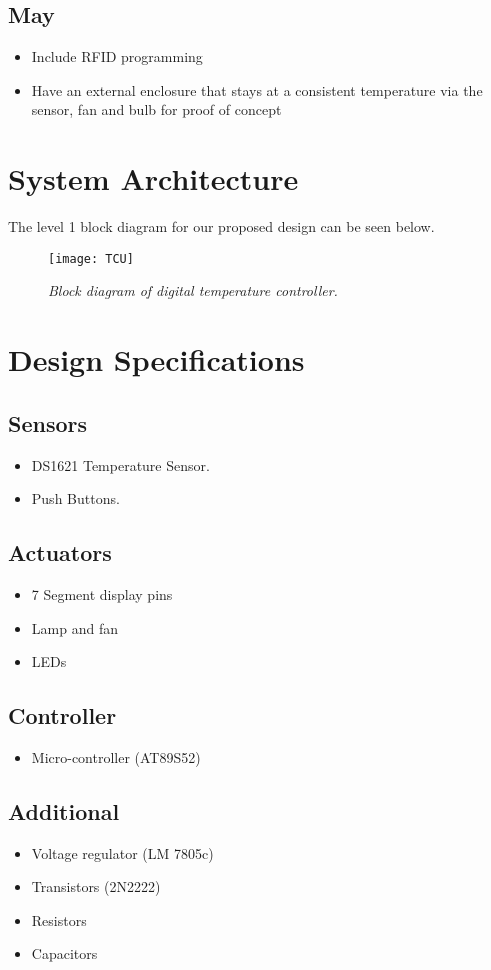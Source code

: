 \documentclass[11pt]{article}
\begin{document}
	
\subsection*{May}

\begin{itemize}
    \item Include RFID programming
\item Have an external enclosure that stays at a consistent temperature via the sensor, fan and bulb for proof of concept

\end{itemize}

\section*{System Architecture}
The level 1 block diagram for our proposed design can be seen below.
	
	\begin{figure}[H]
	\centering
	\texttt{[image: TCU]}
		\caption{\textit{Block diagram of digital temperature controller.}}
	\end{figure}

\section*{Design Specifications}

\subsection*{Sensors}
\begin{itemize}
    \item DS1621 Temperature Sensor.
    \item Push Buttons.

\end{itemize}

\subsection*{Actuators}
\begin{itemize}
    \item 7 Segment display pins
 \item Lamp and fan
\item LEDs
\end{itemize}

\subsection*{Controller}
\begin{itemize}
    \item Micro-controller (AT89S52)
\end{itemize}

\subsection*{Additional}
\begin{itemize}
    \item Voltage regulator (LM 7805c)
\item Transistors (2N2222) 
\item Resistors
\item Capacitors

\end{itemize}
	
\end{document}
